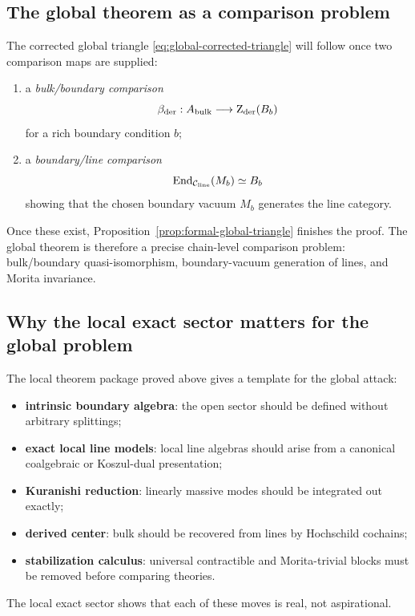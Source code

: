 \subsection{The global theorem as a comparison problem}

The corrected global triangle \eqref{eq:global-corrected-triangle} will follow once two comparison maps are supplied:

\begin{enumerate}[label=(\arabic*),leftmargin=1.8em]
\item a \emph{bulk/boundary comparison}
\[
\beta_{\mathrm{der}}:A_{\mathrm{bulk}}\longrightarrow \operatorname{Z}_{\mathrm{der}}(B_b)
\]
for a rich boundary condition $b$;
\item a \emph{boundary/line comparison}
\[
\operatorname{End}_{\mathcal C_{\mathrm{line}}}(M_b)\simeq B_b
\]
showing that the chosen boundary vacuum $M_b$ generates the line category.
\end{enumerate}

Once these exist, Proposition~\ref{prop:formal-global-triangle}
finishes the proof. The global theorem is therefore a precise
chain-level comparison problem: bulk/boundary quasi-isomorphism,
boundary-vacuum generation of lines, and Morita invariance.

\subsection{Why the local exact sector matters for the global problem}

The local theorem package proved above gives a template for the global attack:
\begin{itemize}[leftmargin=1.8em]
\item \textbf{intrinsic boundary algebra}: the open sector should be defined without arbitrary splittings;
\item \textbf{exact local line models}: local line algebras should arise from a canonical coalgebraic or Koszul-dual presentation;
\item \textbf{Kuranishi reduction}: linearly massive modes should be integrated out exactly;
\item \textbf{derived center}: bulk should be recovered from lines by Hochschild cochains;
\item \textbf{stabilization calculus}: universal contractible and Morita-trivial blocks must be removed before comparing theories.
\end{itemize}
The local exact sector shows that each of these moves is real, not aspirational.

